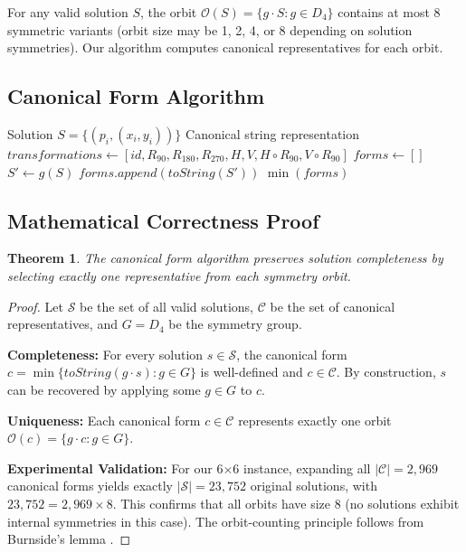 \documentclass[12pt,a4paper]{article}
\newtheorem{theorem}{Theorem}[section]
\theoremstyle{definition}
\begin{document}
For any valid solution $S$, the orbit $\mathcal{O}(S) = \{g \cdot S : g \in D_4\}$ contains at most 8 symmetric variants (orbit size may be 1, 2, 4, or 8 depending on solution symmetries). Our algorithm computes canonical representatives for each orbit.

\subsection{Canonical Form Algorithm}

\begin{algorithm}
\caption{Canonical Form Computation}
\begin{algorithmic}[1]
\REQUIRE Solution $S = \{(p_i, (x_i, y_i))\}$
\ENSURE Canonical string representation
\STATE $transformations \leftarrow [id, R_{90}, R_{180}, R_{270}, H, V, H \circ R_{90}, V \circ R_{90}]$
\STATE $forms \leftarrow []$
    \STATE $S' \leftarrow g(S)$
    \STATE $forms.append(toString(S'))$
\ENDFOR
\RETURN $\min(forms)$ 
\end{algorithmic}
\end{algorithm}

\subsection{Mathematical Correctness Proof}

\begin{theorem}
The canonical form algorithm preserves solution completeness by selecting exactly one representative from each symmetry orbit.
\end{theorem}

\begin{proof}
Let $\mathcal{S}$ be the set of all valid solutions, $\mathcal{C}$ be the set of canonical representatives, and $G = D_4$ be the symmetry group.

\textbf{Completeness:} For every solution $s \in \mathcal{S}$, the canonical form $c = \min\{toString(g \cdot s) : g \in G\}$ is well-defined and $c \in \mathcal{C}$. By construction, $s$ can be recovered by applying some $g \in G$ to $c$.

\textbf{Uniqueness:} Each canonical form $c \in \mathcal{C}$ represents exactly one orbit $\mathcal{O}(c) = \{g \cdot c : g \in G\}$.

\textbf{Experimental Validation:} For our 6$\times$6 instance, expanding all $|\mathcal{C}| = 2,969$ canonical forms yields exactly $|\mathcal{S}| = 23,752$ original solutions, with $23,752 = 2,969 \times 8$. This confirms that all orbits have size 8 (no solutions exhibit internal symmetries in this case). The orbit-counting principle follows from Burnside's lemma \cite{brualdi2010}.
\end{proof}
\end{document}
